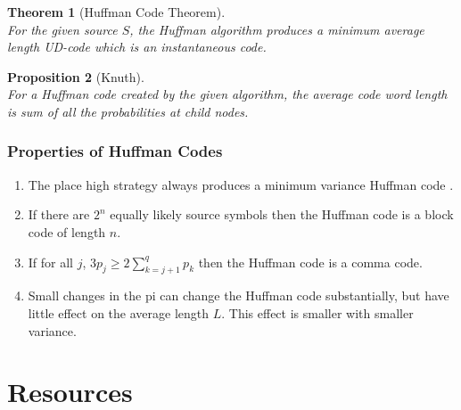 \documentclass{article}
\newtheorem{theorem}{Theorem}[section]
\newtheorem{proposition}[theorem]{Proposition}
\begin{document}
\begin{theorem}[Huffman Code Theorem]
	\mbox{}\\
	For the given source $S$, the Huffman algorithm produces a minimum average length UD-code which is an instantaneous code.
\end{theorem}

\begin{proposition}[Knuth]
	\mbox{}\\
	For a Huffman code created by the given algorithm, the average code word length is sum of all the probabilities at child nodes.
\end{proposition}

\subsubsection{Properties of Huffman Codes}

\begin{enumerate}
	\item The place high strategy always produces a minimum variance Huffman code .
	\item If there are $2^{n}$ equally likely source symbols then the Huffman code is a block code of length $n$.
	\item If for all $j$, $3p_{j} \geq 2 \sum_{k=j+1}^{q}p_{k}$ then the Huffman code is a comma code.
	\item Small changes in the pi can change the Huffman code substantially, but have little effect on the average length $L$. This effect is smaller with smaller variance.
\end{enumerate}

\section*{Resources}
\end{document}
